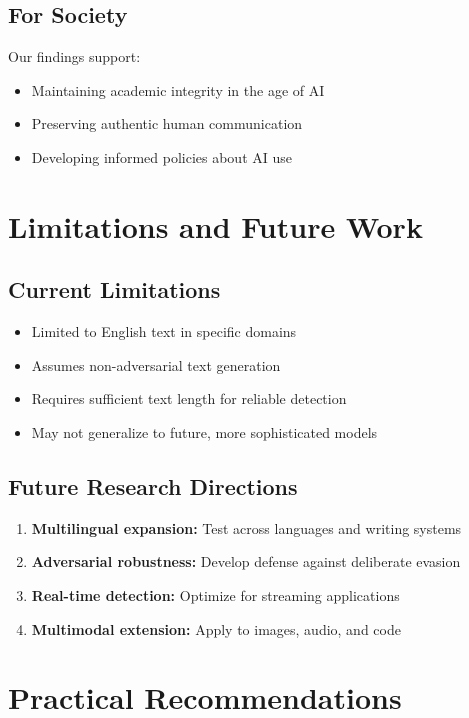 \documentclass[12pt,a4paper]{report}
\begin{document}
\subsection{For Society}

Our findings support:
\begin{itemize}
    \item Maintaining academic integrity in the age of AI
    \item Preserving authentic human communication
    \item Developing informed policies about AI use
\end{itemize}

\section{Limitations and Future Work}

\subsection{Current Limitations}

\begin{itemize}
    \item Limited to English text in specific domains
    \item Assumes non-adversarial text generation
    \item Requires sufficient text length for reliable detection
    \item May not generalize to future, more sophisticated models
\end{itemize}

\subsection{Future Research Directions}

\begin{enumerate}
    \item \textbf{Multilingual expansion:} Test across languages and writing systems
    \item \textbf{Adversarial robustness:} Develop defense against deliberate evasion
    \item \textbf{Real-time detection:} Optimize for streaming applications
    \item \textbf{Multimodal extension:} Apply to images, audio, and code
\end{enumerate}

\section{Practical Recommendations}
\end{document}
